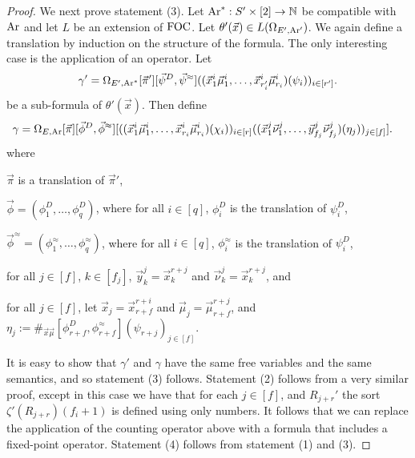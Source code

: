 \documentclass[../main/thesis.tex]{subfiles}
\begin{document}
\begin{proof}
  We next prove statement (3). Let $\text{\upshape Ar}^*: S' \times [2] \rightarrow \mathbb{N}$ be
  compatible with $\text{\upshape Ar}$ and let $L$ be an extension of $\text{\upshape FOC}$. Let
  $\theta'(\vec{x}) \in L(\Omega_{E', \text{\upshape Ar}'})$. We again define a translation by
  induction on the structure of the formula. The only interesting case is the
  application of an operator. Let
  \begin{align*}
    \gamma' = \Omega_{E', \text{\upshape Ar}^*}[\vec{\pi}'][\vec{\psi}^D, \vec{\psi}^{\approx}] ((\vec{x}^i_1 \vec{\mu}^i_1, \ldots, \vec{x}^i_{r_i'} \vec{\mu}^i_{r_i})(\psi_i))_{i \in [r']}.
  \end{align*}
  be a sub-formula of $\theta'(\vec{x})$. Then define
  \begin{align*}
    \gamma = \Omega_{E, \text{\upshape Ar}} [\vec{\pi}] [\vec{\phi}^D, \vec{\phi}^{\approx}]  [((\vec{x}^i_1 \vec{\mu}^i_1, \ldots, \vec{x}^i_{r_i} \vec{\mu}^i_{r_i})(\chi_i))_{i \in [r]}&((\vec{x}^j_1 \vec{\nu}^j_1, \ldots, \vec{y}^j_{f_j} \vec{\nu}^j_{f_j})(\eta_j))_{j \in [f]}].
  \end{align*}
  where
  \begin{myitemize}
  \item $\vec{\pi}$ is a translation of $\vec{\pi}'$,
  \item $\vec{\phi} = (\phi^D_1, \ldots, \phi^D_{q})$, where for all $i \in
    [q]$, $\phi^D_i$ is the translation of $\psi^D_i$,
  \item $\vec{\phi}^{\approx} = (\phi^{\approx}_1, \ldots, \phi^{\approx}_q)$,
    where for all $i \in [q]$, $\phi^{\approx}_i$ is the translation of
    $\psi^D_i$,
  \item for all $j \in [f]$, $k \in [f_j]$, $\vec{y}^j_k = \vec{x}^{r + j}_k$
    and $\vec{\nu}^j_k = \vec{x}^{r+j}_k$, and
  \item for all $j \in [f]$, let $\vec{x}_j = \vec{x}^{r+i}_{r+f}$ and
    $\vec{\mu}_j = \vec{\mu}^{r+j}_{r+f}$, and $\eta_j :=
    \#_{\vec{x}\vec{\mu}}[\phi^D_{r+f},\phi^\approx_{r+f}](\psi_{r+j})_{j \in
      [f]}$.
  \end{myitemize}

  It is easy to show that $\gamma'$ and $\gamma$ have the same free variables
  and the same semantics, and so statement (3) follows. Statement (2) follows
  from a very similar proof, except in this case we have that for each $j \in
  [f]$, and $R_{j+r}'$ the sort $\zeta'(R_{j+r})(f_i + 1)$ is defined using only
  numbers. It follows that we can replace the application of the counting
  operator above with a formula that includes a fixed-point operator. Statement
  (4) follows from statement (1) and (3).
\end{proof}
\end{document}
